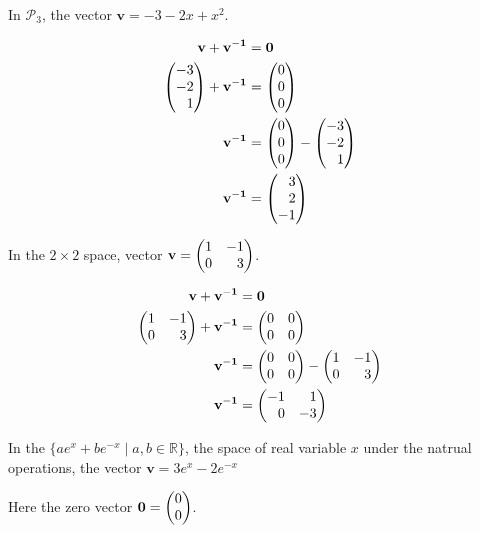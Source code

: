 \documentclass[12pt]{article}
\newenvironment{abc}{\begin{enumerate}[label={\bf(\alph*)}]}{\end{enumerate}}
\newcommand\m[2][]{
	\ifthenelse{\equal {#1} {}}
		{\begin{pmatrix*}[r]#2\end{pmatrix*}}
		{\left(\begin{array}{#1}#2\end{array}\right)}
}
\renewcommand{\vec}[1]{\mathbf{#1}}
\begin{document}
\begin{abc}
\begin{item}
	In $\mathcal{P}_3$, the vector $\vec{v} = -3 - 2x + x^2$.

	\begin{equation*}
	\begin{aligned}
		\vec{v} + \vec{v^{-1}} &= \vec{0} \\
		\m{-3 \\ -2 \\ 1} + \vec{v^{-1}} &= \m{0 \\ 0 \\0} \\
		\vec{v^{-1}} &= \m{0 \\ 0 \\0} - \m{-3 \\ -2 \\ 1} \\
		\vec{v^{-1}} &= \m{3 \\ 2 \\ -1}
	\end{aligned}
	\end{equation*}
\end{item}

\begin{item}
	In the $2 \times 2$ space, vector $\vec{v} = \m{1 & -1 \\ 0 & 3}$.

	\begin{equation*}
	\begin{aligned}
		\vec{v} + \vec{v^{-1}} &= \vec{0} \\
		\m{1 & -1 \\ 0 & 3} + \vec{v^{-1}} &= \m{0 & 0 \\ 0 & 0} \\
		\vec{v^{-1}} &= \m{0 & 0 \\ 0 & 0} - \m{1 & -1 \\ 0 & 3} \\
		\vec{v^{-1}} &= \m{-1 & 1 \\ 0 & -3}
	\end{aligned}
	\end{equation*}
\end{item}

\begin{item}
	In the $\{ae^x + be^{-x} \mid a, b \in \mathbb{R} \}$, the space of real variable $x$ under the natrual operations, the vector $\vec{v} = 3e^x - 2e^{-x}$


	Here the zero vector $\vec{0} = \m{0 \\ 0}$.


\end{item}
\end{abc}
\end{document}
